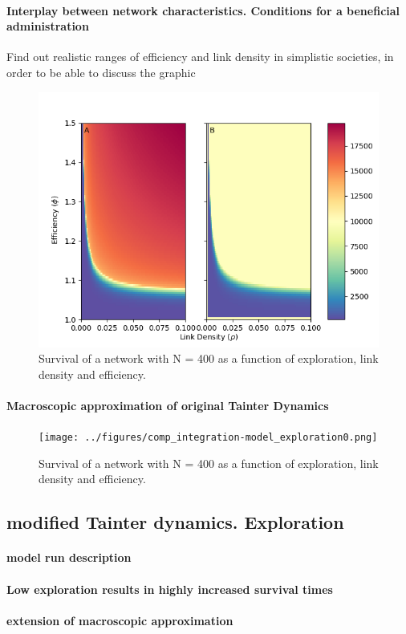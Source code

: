\paragraph{Interplay between network characteristics. Conditions for a beneficial administration}

Find out realistic ranges of efficiency and link density in simplistic societies, in order to be able to discuss the graphic




\begin{figure}[htb]
    \centering
    \includegraphics[width = \linewidth]{../figures/parscan_base0.png}
    \caption{Survival of a network with N = 400 as a function of exploration, link density and efficiency.}
    \label{fig:survival}
\end{figure}



\paragraph{Macroscopic approximation of original Tainter Dynamics}

\begin{figure}[htb]
    \centering
    \texttt{[image: ../figures/comp\_integration-model\_exploration0.png]}
    \caption{Survival of a network with N = 400 as a function of exploration, link density and efficiency.}
    \label{fig:survival}
\end{figure}


\subsection{modified Tainter dynamics. Exploration}

\paragraph{model run description}

\paragraph{Low exploration results in highly increased survival times}

\paragraph{extension of macroscopic approximation}
